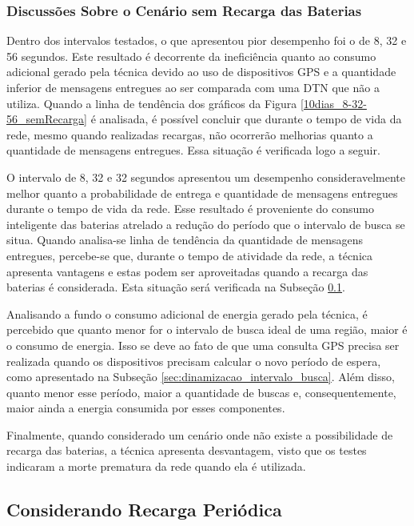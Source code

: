 \subsubsection{Discussões Sobre o Cenário sem Recarga das Baterias}

Dentro dos intervalos testados, o que apresentou pior desempenho foi o de 8, 32 e 56 segundos. Este resultado é decorrente da ineficiência quanto ao consumo adicional gerado pela técnica devido ao uso de dispositivos GPS e a quantidade inferior de mensagens entregues ao ser comparada com uma DTN que não a utiliza. Quando a linha de tendência dos gráficos da Figura \ref{10dias_8-32-56_semRecarga} é analisada, é possível concluir que durante o tempo de vida da rede, mesmo quando realizadas recargas, não ocorrerão melhorias quanto a quantidade de mensagens entregues. Essa situação é verificada logo a seguir.

O intervalo de 8, 32 e 32 segundos apresentou um desempenho consideravelmente melhor quanto a probabilidade de entrega e quantidade de mensagens entregues durante o tempo de vida da rede. Esse resultado é proveniente do consumo inteligente das baterias atrelado a redução do período que o intervalo de busca se situa. Quando analisa-se linha de tendência da quantidade de mensagens entregues, percebe-se que, durante o tempo de atividade da rede, a técnica apresenta vantagens e estas podem ser aproveitadas quando a recarga das baterias é considerada. Esta situação será verificada na Subseção \ref{subsec:testes_com_recarga}.

Analisando a fundo o consumo adicional de energia gerado pela técnica, é percebido que quanto menor for o intervalo de busca ideal de uma região, maior é o consumo de energia. Isso se deve ao fato de que uma consulta GPS precisa ser realizada quando os dispositivos precisam calcular o novo período de espera, como apresentado na Subseção \ref{sec:dinamizacao_intervalo_busca}. Além disso, quanto menor esse período, maior a quantidade de buscas e, consequentemente, maior ainda a energia consumida por esses componentes.

Finalmente, quando considerado um cenário onde não existe a possibilidade de recarga das baterias, a técnica apresenta desvantagem, visto que os testes indicaram a morte prematura da rede quando ela é utilizada.

\subsection{Considerando Recarga Periódica}
\label{subsec:testes_com_recarga}

